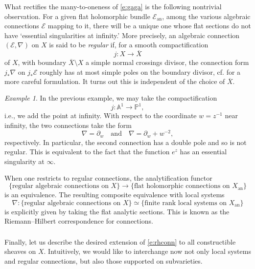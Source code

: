\documentclass[10pt]{amsart}
\newcommand{\on}{\operatorname}
\theoremstyle{remark}
\newtheorem{ex}[subsubsection]{Example}
\newcommand{\sE}{\mathscr{E}}
\numberwithin{equation}{section}
\begin{document}
	What rectifies the many-to-oneness of \eqref{e:gaga} is the following 
	nontrivial observation. For a given flat holomorphic bundle 
	$\sE_{\on{an}}$, among the various algebraic connections $\sE$ mapping to 
	it, there will be a unique one whose flat sections do not have `essential 
	singularities at infinity.' More precisely, an algebraic connection $(\sE, 
	\nabla)$ on $X$ is said to be {\em regular} if, for a 
	smooth 
	compactification $$j: X \rightarrow \overline{X}$$ of $X$, with boundary 
	$\overline{X} \setminus X$ a simple normal crossings divisor,
	the connection form $j_* \nabla$ on $j_* \sE$ roughly has at most simple poles on 
	the boundary divisor, cf. \cite{hottatakeuchitanisaki} for a more careful formulation. It turns out this is independent of the choice of $\overline{X}$. 
	
	\begin{ex} In the previous example, we may take the compactification 
		\[
		j: \mathbb{A}^1 \rightarrow \mathbb{P}^1, 
		\]
		i.e., we add the point at infinity. With respect to the coordinate $w = 
		z^{-1}$ near infinity, the two connections take the form 
		\[
		\nabla = \partial_w \quad \text{and} \quad \nabla = \partial_w + w^{-2},
		\]
		respectively. In particular, the second connection has a double pole 
		and so is not regular. This is equivalent to the fact that the function 
		$e^z$ has an essential singularity at $\infty$. 
	\end{ex}
	
	When one restricts to regular connections, the analytification functor 
	\[
	\{ \text{regular algebraic connections on $X$} \} \rightarrow \{  
	\text{flat holomorphic connections on $X_{\on{an}}$} \} 
	\]
	is an equivalence. The resulting composite equivalence with local systems
	\begin{equation} \label{e:rhconn}
	\nabla: \{ \text{regular algebraic connections on $X$} \} \simeq 
	\{\text{finite rank local systems on $X_{\on{an}}$} \}
	\end{equation}
	is explicitly given by taking the flat analytic sections. This is known as the 
	Riemann--Hilbert correspondence for connections. 
	
	
	
	\subsubsection{} Finally, let us describe the desired extension of 
	\eqref{e:rhconn} to all constructible sheaves on $X$. Intuitively, we would 
	like to interchange now not only local systems and regular connections, but 
	also those supported on subvarieties. 
	
\end{document}
